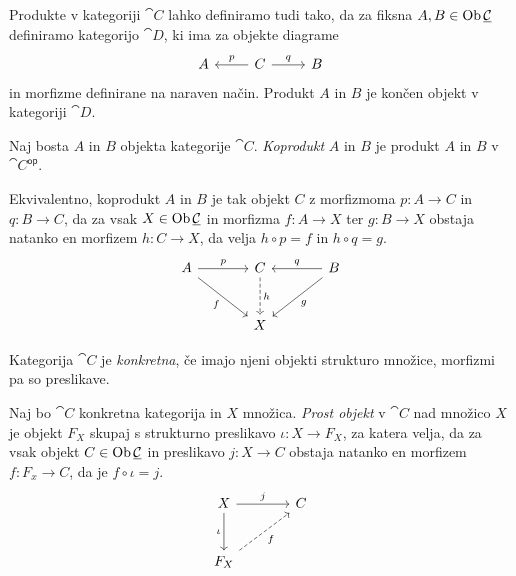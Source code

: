 \begin{opomba}
Produkte v kategoriji $\cat{C}$ lahko definiramo tudi tako, da
za fiksna $A, B \in \operatorname{Ob} \underline{\mathcal{C}}$ definiramo kategorijo $\cat{D}$,
ki ima za objekte diagrame
\[
\begin{tikzcd}
A & C \arrow[l, "p"'] \arrow[r, "q"] & B
\end{tikzcd}
\]
in morfizme definirane na naraven način. Produkt $A$ in $B$ je
končen objekt v kategoriji $\cat{D}$.
\end{opomba}

\begin{definicija}
Naj bosta $A$ in $B$ objekta kategorije $\cat{C}$.
\emph{Koprodukt} $A$ in $B$ je produkt
$A$ in $B$ v $\cat{C}^{\mathsf{op}}$.
\end{definicija}

\begin{opomba}
Ekvivalentno, koprodukt $A$ in $B$ je tak objekt $C$ z morfizmoma
$p \colon A \to C$ in $q \colon B \to C$, da za vsak
$X \in \operatorname{Ob} \underline{\mathcal{C}}$ in morfizma $f \colon A \to X$ ter
$g \colon B \to X$ obstaja natanko en morfizem $h \colon C \to X$,
da velja $h \circ p = f$ in $h \circ q = g$.
\[
\begin{tikzcd}[column sep=large, row sep=large]
A \arrow[r, "p"] \arrow[dr, "f"'] &
C \arrow[d, dashrightarrow, "h"] &
B \arrow[l, "q"'] \arrow[dl, "g"] \\
  & X
\end{tikzcd}
\]
\end{opomba}

\begin{definicija}
Kategorija $\cat{C}$ je
\emph{konkretna}, če imajo njeni
objekti strukturo množice, morfizmi pa so preslikave.
\end{definicija}

\begin{definicija}
Naj bo $\cat{C}$ konkretna kategorija in $X$ množica.
\emph{Prost objekt} v $\cat{C}$ nad
množico $X$ je objekt $F_X$ skupaj s strukturno preslikavo
$\iota \colon X \to F_X$, za katera velja, da za vsak objekt
$C \in \operatorname{Ob} \underline{\mathcal{C}}$ in preslikavo $j \colon X \to C$ obstaja
natanko en morfizem $f \colon F_x \to C$, da je
$f \circ \iota = j$.
\[
\begin{tikzcd}[column sep = large, row sep=large]
X \arrow[r, "j"] \arrow[d, "\iota"'] & C \\
F_X \arrow[ur, dashrightarrow, "f"']
\end{tikzcd}
\]
\end{definicija}

